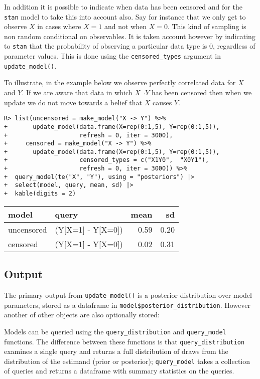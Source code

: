 \documentclass[
  11pt,
  article]{jss}
\begin{document}
In addition it is possible to indicate when data has been censored and
for the \texttt{stan} model to take this into account also. Say for
instance that we only get to observe \(X\) in cases where \(X=1\) and
not when \(X=0\). This kind of sampling is non random conditional on
observables. It is taken account however by indicating to \texttt{stan}
that the probability of observing a particular data type is 0,
regardless of parameter values. This is done using the
\texttt{censored\_types} argument in \texttt{update\_model()}.

To illustrate, in the example below we observe perfectly correlated data
for \(X\) and \(Y\). If we are aware that data in which \(X \neg Y\) has
been censored then when we update we do not move towards a belief that
\(X\) causes \(Y\).

\begin{verbatim}
R> list(uncensored = make_model("X -> Y") %>%
+       update_model(data.frame(X=rep(0:1,5), Y=rep(0:1,5)),
+                    refresh = 0, iter = 3000),
+     censored = make_model("X -> Y") %>%
+       update_model(data.frame(X=rep(0:1,5), Y=rep(0:1,5)),
+                    censored_types = c("X1Y0",  "X0Y1"),
+                    refresh = 0, iter = 3000)) %>%
+  query_model(te("X", "Y"), using = "posteriors") |>
+  select(model, query, mean, sd) |>
+  kable(digits = 2)
\end{verbatim}

\begin{tabular}{l|l|r|r}
\hline
model & query & mean & sd\\
\hline
uncensored & (Y[X=1] - Y[X=0]) & 0.59 & 0.20\\
\hline
censored & (Y[X=1] - Y[X=0]) & 0.02 & 0.31\\
\hline
\end{tabular}

\hypertarget{output}{%
\subsection{Output}\label{output}}

The primary output from \texttt{update\_model()} is a posterior
distribution over model parameters, stored as a dataframe in
\texttt{model\$posterior\_distribution}. However another of other
objects are also optionally stored:

Models can be queried using the \texttt{query\_distribution} and
\texttt{query\_model} functions. The difference between these functions
is that \texttt{query\_distribution} examines a single query and returns
a full distribution of draws from the distribution of the estimand
(prior or posterior); \texttt{query\_model} takes a collection of
queries and returns a dataframe with summary statistics on the queries.
\end{document}
